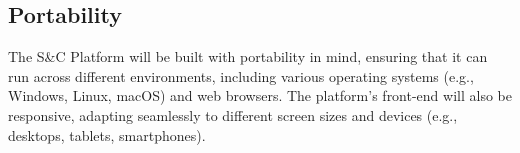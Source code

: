 \subsection{Portability}
The S\&C Platform will be built with portability in mind, 
ensuring that it can run across different environments, 
including various operating systems (e.g., Windows, Linux, macOS) and web browsers. 
The platform’s front-end will also be responsive, 
adapting seamlessly to different screen sizes and devices (e.g., desktops, tablets, smartphones).
